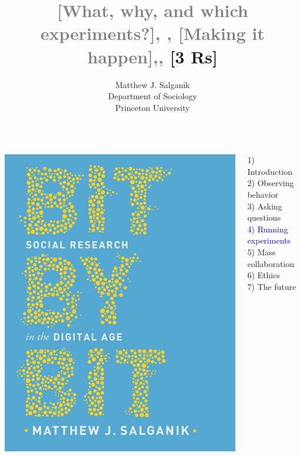 \documentclass[aspectratio=169]{beamer}
\title[]{\textcolor{gray}{[What, why, and which experiments?], \newline [Moving beyond simple experiments], [Making it happen],\newline [Zero variable cost data and MusicLab],} [3 Rs]}
\author[]{Matthew J. Salganik\\Department of Sociology\\Princeton University}
\date[]{
\begin{flushright}
\texttt{[image: figures/cc-by.png]}
\end{flushright}
}
\begin{document}
\frame{\titlepage}
\begin{frame}

\begin{columns}
\begin{column}{.40\textwidth}
\includegraphics[width=\textwidth]{figures/salganik_bit_2018_cover}
\end{column}%

\hfill%

\begin{column}{.60\textwidth}
1) Introduction \\
2) Observing behavior \\
3) Asking questions \\
\textcolor{blue}{4) Running experiments} \\
5) Mass collaboration \\
6) Ethics \\
7) The future \\
\end{column}%
\end{columns}

\end{frame}
\end{document}
